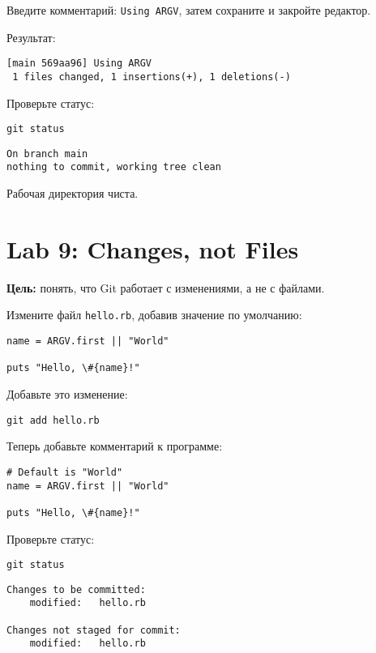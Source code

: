 \documentclass[a4paper,12pt]{report}
\begin{document}
Введите комментарий: \texttt{Using ARGV}, затем сохраните и закройте редактор.

Результат:
\begin{verbatim}
[main 569aa96] Using ARGV
 1 files changed, 1 insertions(+), 1 deletions(-)
\end{verbatim}

Проверьте статус:
\begin{verbatim}
git status
\end{verbatim}

\begin{verbatim}
On branch main
nothing to commit, working tree clean
\end{verbatim}

Рабочая директория чиста.



\section{Lab 9: Changes, not Files}
\textbf{Цель:} понять, что Git работает с изменениями, а не с файлами.

Измените файл \texttt{hello.rb}, добавив значение по умолчанию:
\begin{verbatim}
name = ARGV.first || "World"

puts "Hello, \#{name}!"
\end{verbatim}

Добавьте это изменение:
\begin{verbatim}
git add hello.rb
\end{verbatim}

Теперь добавьте комментарий к программе:
\begin{verbatim}
# Default is "World"
name = ARGV.first || "World"

puts "Hello, \#{name}!"
\end{verbatim}

Проверьте статус:
\begin{verbatim}
git status
\end{verbatim}

\begin{verbatim}
Changes to be committed:
	modified:   hello.rb

Changes not staged for commit:
	modified:   hello.rb
\end{verbatim}
\end{document}
